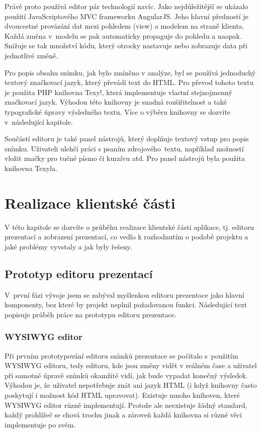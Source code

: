 \documentclass[11pt,twoside,a4paper]{book}
\newcommand*{\nom}[2]{#1 \nomenclature{#1}{#2}} 			%
\begin{document}
Právě proto používá editor pár technologií navíc. Jako nejdůležitější se ukázalo použití JavaScriptového \nom{MVC}{Model-View-Controller} frameworku AngularJS\cite{angular}. Jeho hlavní předností je dvoucestné provázání dat mezi pohledem (view) a modelem na straně klienta. Každá změna v~modelu se pak automaticky propaguje do pohledu a naopak. Snižuje se tak množství kódu, který otrocky nastavuje nebo zobrazuje data při jednotlivé změně. 

Pro popis obsahu snímku, jak bylo zmíněno v analýze, byl se používá jednoduchý textový značkovací jazyk, který převádí text do HTML. Pro převod tohoto textu je použita PHP knihovna Texy!\cite{texy}, která implementuje vlastní stejnojmenný značkovací jazyk. Výhodou této knihovny je snadná rozšiřitelnost a také typografické úpravy výsledného textu. Více o výběru knihovny se dozvíte v~následující kapitole.

Součástí editoru je také panel nástrojů, který doplňuje textový vstup pro popis snímku. Uživateli ulehčí práci s psaním zdrojového~textu, například možností vložit značky pro tučné písmo či kurzívu atd. Pro panel nástrojů byla použita knihovna Texyla\cite{texyla}.



\chapter{Realizace klientské části} \label{chap:realizace}
V této kapitole se dozvíte o průběhu realizace klientské části aplikace, tj. editoru prezentací a zobrazení prezentací, co vedlo k rozhodnutím o podobě projektu a jaké problémy vyvstaly a jak byly řešeny.

\section{Prototyp editoru prezentací}
V~první fázi vývoje jsem se zabýval myšlenkou editoru prezentace jako hlavní komponenty, bez které by projekt neplnil požadovanou funkci. Následující text popisuje průběh práce na prototypu editoru prezentace.

\subsection{WYSIWYG editor}
Při prvním prototypování editoru snímků prezentace se počítalo s~použitím WYSIWYG editoru, tedy editoru, kde jsou změny vidět v reálném čase a uživatel při samotné úpravě snímků okamžitě vidí, jak bude vypadat konečný výsledek. Výhodou je, že uživatel nepotřebuje znát ani jazyk HTML (i když knihovny často poskytují i možnost kód HTML upravovat). Existuje mnoho knihoven, které WYSIWYG editor různě implementují. Protože ale neexistuje žádný standard, každý prohlížeč se chová trochu jinak a zároveň každá knihovna si různé věci implementuje po svém.
\end{document}
